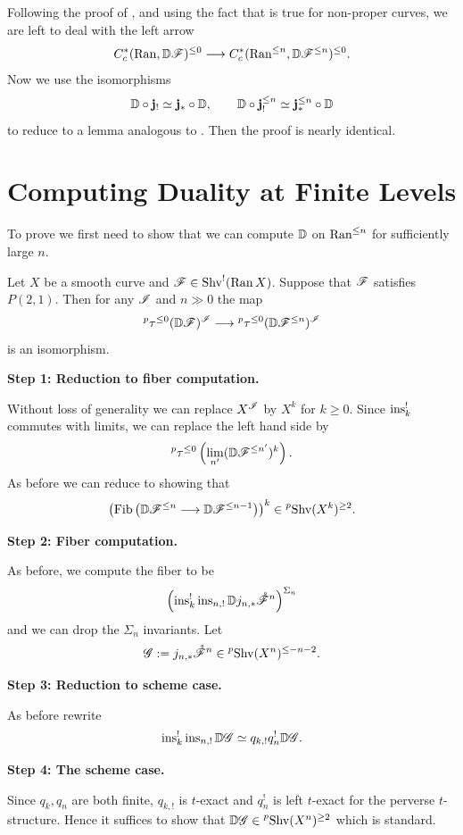 \documentclass[oneside]{amsart}
\newcommand{\pShv}{\prescript{p}{}{\Shv}}
\newcommand{\ptau}{\prescript{p}{}{\tau}}
\begin{document}
Following the proof of , and using the fact that  is true for non-proper curves, we are left to deal with the left arrow
\[
C^{*}_c(\Ran, \VD\CF)^{\le 0} \to C_c^{*}(\Ran^{\le n}, \VD\CF^{\le n})^{\le 0}.
\] 
Now we use the isomorphisms
\[
	\mathbb{D}\circ \mathbf{j}_! \simeq \mathbf{j}_* \circ \mathbb{D},\qquad \mathbb{D} \circ \mathbf{j}^{\le n}_! \simeq \mathbf{j}^{\le n}_*\circ \mathbb{D}
\] 
to reduce to a lemma analogous to . Then the proof is nearly identical.

\section{Computing Duality at Finite Levels}
To prove  we first need to show that we can compute $\mathbb{D}$ on $\operatorname{Ran}^{\le n}$ for sufficiently large $n$.
\begin{proposition}\label{prop:vdtrunc}
	Let $X$ be a smooth curve and $\mathscr{F}\in \operatorname{Shv}^{!}(\operatorname{Ran} X)$. Suppose that $\mathscr{F}$ satisfies $P(2,1)$. Then for any $\mathscr{I}$ and $n\gg 0$ the map
	\[
		\ptau^{\le 0}(\VD\CF)^{\CI} \to \ptau^{\le 0}(\VD\CF^{\le n})^{\CI}
	\] 
	is an isomorphism.
\end{proposition}

\textbf{Step 1: Reduction to fiber computation.}

Without loss of generality we can replace $X^{\mathscr{I}}$ by $X^{k}$ for $k\ge 0$. Since $\operatorname{ins}_k^{!}$ commutes with limits, we can replace the left hand side by
\[
\ptau^{\le 0} \left( \lim_{n'} (\VD\CF^{\le n'})^{k} \right) .
\] 
As before we can reduce to showing that
\[
\left( \Fib \left( \VD\CF^{\le n} \to \VD\CF^{\le n-1} \right)  \right) ^{k} \in \pShv(X^{k})^{\ge 2}.
\] 

\textbf{Step 2: Fiber computation.}

As before, we compute the fiber to be
\[
	\left( \operatorname{ins}_k^{!}\operatorname{ins}_{n,!}\mathbb{D} j_{n,*}\mathring{\mathscr{F}}^{n} \right) ^{\Sigma_n}
\] 
and we can drop the $\Sigma_n$ invariants. Let
\[
	\CG \defeq j_{n,*}\mathring{\CF}^{n} \in \pShv(X^{n})^{\le -n-2}.
\] 

\textbf{Step 3: Reduction to scheme case.}

As before rewrite
\[
\operatorname{ins}_k^{!}\operatorname{ins}_{n,!}\mathbb{D}\mathscr{G} \simeq q_{k,!}q_n^{!}\mathbb{D}\mathscr{G}.
\] 

\textbf{Step 4: The scheme case.}

Since $q_k,q_n$ are both finite, $q_{k,!}$ is $t$-exact and $q_n^{!} $ is left $t$-exact for the perverse $t$-structure. Hence it suffices to show that $\VD\CG\in \pShv(X^{n})^{\ge 2}$ which is standard.
\end{document}
